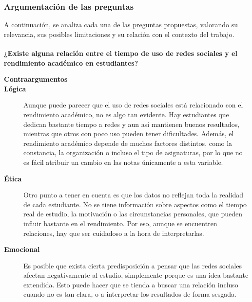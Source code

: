 \documentclass[12pt]{article}
\begin{document}
\subsubsection{Argumentación de las preguntas}
A continuación, se analiza cada una de las preguntas propuestas, valorando su relevancia, sus posibles limitaciones y su relación con el contexto del trabajo.
\\
\\
\textbf{¿Existe alguna relación entre el tiempo de uso de redes sociales y el rendimiento académico en estudiantes?}

\begin{description}

\item[\textbf{Contraargumentos}]
\item[\textbf{Lógica}] Aunque puede parecer que el uso de redes sociales está relacionado con el rendimiento académico, no es algo tan evidente. Hay estudiantes que dedican bastante tiempo a redes y aun así mantienen buenos resultados, mientras que otros con poco uso pueden tener dificultades. Además, el rendimiento académico depende de muchos factores distintos, como la constancia, la organización o incluso el tipo de asignaturas, por lo que no es fácil atribuir un cambio en las notas únicamente a esta variable.
\item[\textbf{Ética}] Otro punto a tener en cuenta es que los datos no reflejan toda la realidad de cada estudiante. No se tiene información sobre aspectos como el tiempo real de estudio, la motivación o las circunstancias personales, que pueden influir bastante en el rendimiento. Por eso, aunque se encuentren relaciones, hay que ser cuidadoso a la hora de interpretarlas.
\item[\textbf{Emocional}] Es posible que exista cierta predisposición a pensar que las redes sociales afectan negativamente al estudio, simplemente porque es una idea bastante extendida. Esto puede hacer que se tienda a buscar una relación incluso cuando no es tan clara, o a interpretar los resultados de forma sesgada.


\end{description}
\end{document}
